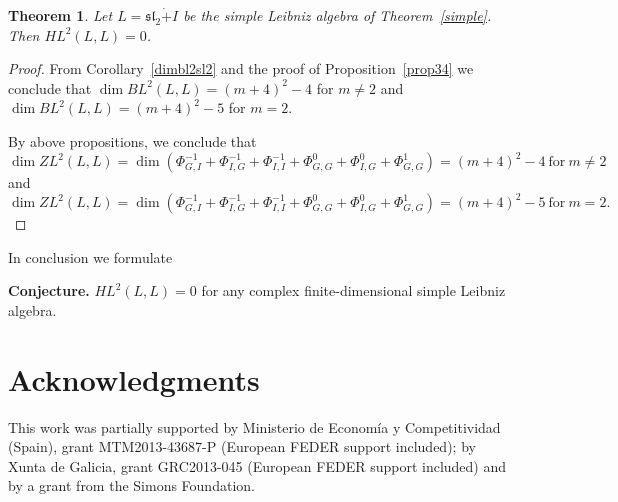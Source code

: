 \documentclass[12pt,reqno]{amsart}
\newtheorem{thm}{Theorem}[section]
\numberwithin{equation}{section}
\begin{document}
\begin{thm} Let $L= \mathfrak{sl}_2\dot{+}I$ be the simple Leibniz algebra of Theorem~\ref{simple}. Then $HL^2(L,L)=0$.
\end{thm}
\begin{proof} From Corollary~\ref{dimbl2sl2} and the proof of Proposition~\ref{prop34} we conclude that $\dim BL^2(L, L) =(m+4)^2-4$ for $m\neq2$ and $\dim BL^2(L, L) =(m+4)^2-5$  for $m=2$.

By above  propositions, we conclude that
\[\dim ZL^2(L,L)=\dim(\Phi_{G,I}^{-1}+\Phi_{I,G}^{-1}+\Phi_{I,I}^{-1}+
\Phi_{G,G}^{0}+\Phi_{I,G}^{0}+\Phi_{G,G}^{1})=(m+4)^2-4  \ \text{for} \  m\neq 2\]
 and
\[\dim ZL^2(L,L)=\dim(\Phi_{G,I}^{-1}+\Phi_{I,G}^{-1}+\Phi_{I,I}^{-1}+
\Phi_{G,G}^{0}+\Phi_{I,G}^{0}+\Phi_{G,G}^{1})=(m+4)^2-5 \ \text{for}  \ m=2.\]
\end{proof}

In conclusion we formulate

\textbf{Conjecture.} $HL^2(L,L)=0$ for any complex finite-dimensional simple Leibniz algebra.

\section*{Acknowledgments}

This work was partially supported by Ministerio de Econom\'ia y Competitividad (Spain),
grant MTM2013-43687-P (European FEDER support included); by Xunta de Galicia, grant GRC2013-045 (European FEDER support included) and by a grant from the Simons Foundation.
\end{document}
